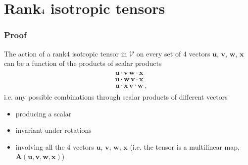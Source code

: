 \documentclass[letterpaper,10pt,english]{jupyterBook}
\begin{document}
\section{Rank\sphinxhyphen{}\protect\(4\protect\) isotropic tensors}
\label{\detokenize{ch/tensor-algebra-calculus/algebra-isotropic-tensors:rank-4-isotropic-tensors}}\subsubsection*{Proof}

\sphinxAtStartPar
The action of a rank\sphinxhyphen{}\(4\) isotropic tensor in \(\mathscr{V}\) on every set of 4 vectors \(\mathbf{u}\), \(\mathbf{v}\), \(\mathbf{w}\), \(\mathbf{x}\) can be a function of the products of scalar products
\begin{equation*}
\begin{split}\begin{aligned}
  & \mathbf{u} \cdot \mathbf{v} \, \mathbf{w} \cdot \mathbf{x} \\
  & \mathbf{u} \cdot \mathbf{w} \, \mathbf{v} \cdot \mathbf{x} \\
  & \mathbf{u} \cdot \mathbf{x} \, \mathbf{v} \cdot \mathbf{w} \ ,
\end{aligned}\end{split}
\end{equation*}
\sphinxAtStartPar
i.e. any possible combinations through scalar products of different vectors
\begin{itemize}
\item {} 
\sphinxAtStartPar
producing a scalar

\item {} 
\sphinxAtStartPar
invariant under rotations

\item {} 
\sphinxAtStartPar
involving all the 4 vectors \(\mathbf{u}\), \(\mathbf{v}\), \(\mathbf{w}\), \(\mathbf{x}\) (i.e. the tensor is a multilinear map, \(\mathbf{A}(\mathbf{u}, \mathbf{v}, \mathbf{w}, \mathbf{x})\))

\end{itemize}
\end{document}
